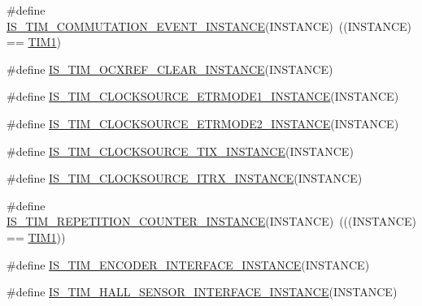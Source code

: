 \begin{DoxyCompactItemize}
\item 
\#define \hyperlink{group___exported__macros_ga5f61206c3c8b20784f9d237dce300afd}{I\+S\+\_\+\+T\+I\+M\+\_\+\+C\+O\+M\+M\+U\+T\+A\+T\+I\+O\+N\+\_\+\+E\+V\+E\+N\+T\+\_\+\+I\+N\+S\+T\+A\+N\+CE}(I\+N\+S\+T\+A\+N\+CE)~((I\+N\+S\+T\+A\+N\+CE) == \hyperlink{group___peripheral__declaration_ga2e87451fea8dc9380056d3cfc5ed81fb}{T\+I\+M1})
\item 
\#define \hyperlink{group___exported__macros_ga7bf2abf939c55a4c8284c184735accdc}{I\+S\+\_\+\+T\+I\+M\+\_\+\+O\+C\+X\+R\+E\+F\+\_\+\+C\+L\+E\+A\+R\+\_\+\+I\+N\+S\+T\+A\+N\+CE}(I\+N\+S\+T\+A\+N\+CE)
\item 
\#define \hyperlink{group___exported__macros_ga0ca20886f56bf7611ad511433b9caade}{I\+S\+\_\+\+T\+I\+M\+\_\+\+C\+L\+O\+C\+K\+S\+O\+U\+R\+C\+E\+\_\+\+E\+T\+R\+M\+O\+D\+E1\+\_\+\+I\+N\+S\+T\+A\+N\+CE}(I\+N\+S\+T\+A\+N\+CE)
\item 
\#define \hyperlink{group___exported__macros_ga7beb8f84094e6a1567d10177cc4fdae9}{I\+S\+\_\+\+T\+I\+M\+\_\+\+C\+L\+O\+C\+K\+S\+O\+U\+R\+C\+E\+\_\+\+E\+T\+R\+M\+O\+D\+E2\+\_\+\+I\+N\+S\+T\+A\+N\+CE}(I\+N\+S\+T\+A\+N\+CE)
\item 
\#define \hyperlink{group___exported__macros_gacbd23fd1f9f73dc249b16c89131a671c}{I\+S\+\_\+\+T\+I\+M\+\_\+\+C\+L\+O\+C\+K\+S\+O\+U\+R\+C\+E\+\_\+\+T\+I\+X\+\_\+\+I\+N\+S\+T\+A\+N\+CE}(I\+N\+S\+T\+A\+N\+CE)
\item 
\#define \hyperlink{group___exported__macros_ga57882c3c75fddf0ccf0c6ecf99b3d3df}{I\+S\+\_\+\+T\+I\+M\+\_\+\+C\+L\+O\+C\+K\+S\+O\+U\+R\+C\+E\+\_\+\+I\+T\+R\+X\+\_\+\+I\+N\+S\+T\+A\+N\+CE}(I\+N\+S\+T\+A\+N\+CE)
\item 
\#define \hyperlink{group___exported__macros_ga3b470612fd4c4e29fb985247056b1e07}{I\+S\+\_\+\+T\+I\+M\+\_\+\+R\+E\+P\+E\+T\+I\+T\+I\+O\+N\+\_\+\+C\+O\+U\+N\+T\+E\+R\+\_\+\+I\+N\+S\+T\+A\+N\+CE}(I\+N\+S\+T\+A\+N\+CE)~(((I\+N\+S\+T\+A\+N\+CE) == \hyperlink{group___peripheral__declaration_ga2e87451fea8dc9380056d3cfc5ed81fb}{T\+I\+M1}))
\item 
\#define \hyperlink{group___exported__macros_gacb14170c4996e004849647d8cb626402}{I\+S\+\_\+\+T\+I\+M\+\_\+\+E\+N\+C\+O\+D\+E\+R\+\_\+\+I\+N\+T\+E\+R\+F\+A\+C\+E\+\_\+\+I\+N\+S\+T\+A\+N\+CE}(I\+N\+S\+T\+A\+N\+CE)
\item 
\#define \hyperlink{group___exported__macros_ga979ea18ba0931f5ed15cc2f3ac84794b}{I\+S\+\_\+\+T\+I\+M\+\_\+\+H\+A\+L\+L\+\_\+\+S\+E\+N\+S\+O\+R\+\_\+\+I\+N\+T\+E\+R\+F\+A\+C\+E\+\_\+\+I\+N\+S\+T\+A\+N\+CE}(I\+N\+S\+T\+A\+N\+CE)
\item 

\end{DoxyCompactItemize}
